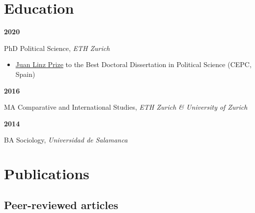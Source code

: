 \documentclass[a4paper, 12pt]{article}
\begin{document}
\vspace{-0pt}
\section*{Education}

\begin{minipage}[t]{0.1\textwidth}
  \flushleft
	\textbf{2020}
\end{minipage}
\begin{minipage}[t]{0.9\textwidth}
  PhD Political Science, \textit{ETH Zurich}
	\vspace{-5pt}
	\begin{itemize}[leftmargin=18pt]\small
		\renewcommand\labelitemi{{\boldmath$\cdot$}}
	  \item \href{https://www.cepc.gob.es/premio-juan-linz}{Juan Linz Prize} to the Best Doctoral Dissertation in Political Science (CEPC, Spain)
	\end{itemize}
\end{minipage}

\vspace{10pt}

\noindent
\begin{minipage}[t]{0.1\textwidth}
  \flushleft
	\textbf{2016}
\end{minipage}
\begin{minipage}[t]{0.9\textwidth}
  MA Comparative and International Studies, \textit{ETH Zurich \& University of Zurich}
\end{minipage}


\noindent
\begin{minipage}[t]{0.1\textwidth}
  \flushleft
	\textbf{2014}
\end{minipage}
\begin{minipage}[t]{0.9\textwidth}
  BA Sociology, \textit{Universidad de Salamanca}
\end{minipage}

\section*{Publications}

\subsection*{Peer-reviewed articles}
\end{document}
